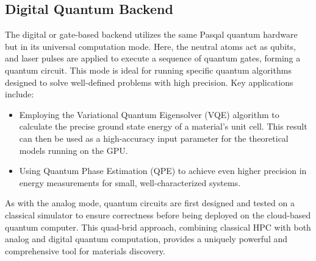 \subsection{Digital Quantum Backend}
The digital or gate-based backend utilizes the same Pasqal quantum hardware but in its universal computation mode. Here, the neutral atoms act as qubits, and laser pulses are applied to execute a sequence of quantum gates, forming a quantum circuit. This mode is ideal for running specific quantum algorithms designed to solve well-defined problems with high precision. Key applications include:
\begin{itemize}
    \item Employing the Variational Quantum Eigensolver (VQE) algorithm to calculate the precise ground state energy of a material's unit cell. This result can then be used as a high-accuracy input parameter for the theoretical models running on the GPU.
    \item Using Quantum Phase Estimation (QPE) to achieve even higher precision in energy measurements for small, well-characterized systems.
\end{itemize}
As with the analog mode, quantum circuits are first designed and tested on a classical simulator to ensure correctness before being deployed on the cloud-based quantum computer. This quad-brid approach, combining classical HPC with both analog and digital quantum computation, provides a uniquely powerful and comprehensive tool for materials discovery.
